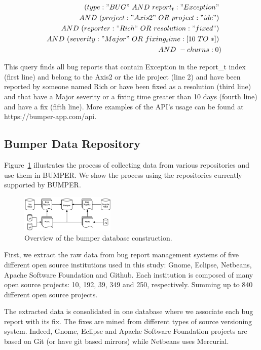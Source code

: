 \documentclass[conference]{IEEEtran}
\begin{document}
\begin{equation}
\begin{split}
  (type:"BUG"~AND~report_t:"Exception"~\\
~~AND~(project:"Axis2"~OR~project:"ide")~\\
~~AND~(reporter:"Rich"~OR~resolution:"fixed")~\\
~~AND~(severity:"Major"~OR~fixing_time:[10~TO~*])~\\
~~AND~-churns:0)
\end{split}
\end{equation}

This query finds all bug reports that contain Exception in the
report\_t index (first line) and belong to the Axis2 or the ide
project (line 2) and have been reported by someone named Rich
or have been fixed as a resolution (third line) and that have a
Major severity or a fixing time greater than 10 days (fourth line)
and have a fix (fifth line).
More examples of the API’s usage can
be found at https://bumper-app.com/api.


\subsection{Bumper Data Repository}
\label{sub:Bumper Data Repository}

Figure~\ref{fig:data-collection}  illustrates the process of collecting
data from various repositories and use them in BUMPER.
We show the process using the repositories currently supported by BUMPER.

\begin{figure}[h!]
  \centering
    \includegraphics[width=0.4\textwidth]{media/dc.png}
    \caption{Overview of the bumper database construction.\label{fig:data-collection}}
\end{figure}

First, we extract the raw data from bug report management systems of five different open source institutions used in this study: Gnome, Eclipse, Netbeans, Apache Software Foundation and Github.
Each institution is composed of many open source projects: 10, 192, 39, 349 and 250, respectively. Summing up to 840 different open source projects.

The extracted data is consolidated in one database where we associate each bug report with its fix.
The fixes are mined from different types of source versioning system.
Indeed, Gnome, Eclipse and Apache Software Foundation projects are based on Git (or have git based mirrors) while Netbeans uses Mercurial.
\end{document}
